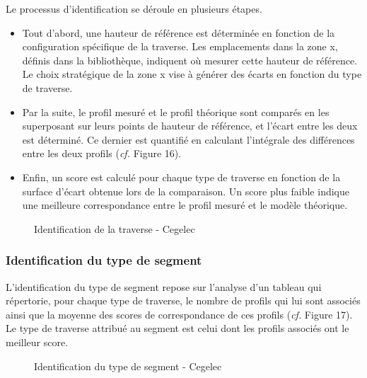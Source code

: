 \noindent Le processus d'identification se déroule en plusieurs étapes.
\begin{itemize}
\item Tout d'abord, une hauteur de référence est déterminée en fonction de la configuration spécifique de la traverse. Les emplacements dans la zone x, définis dans la bibliothèque, indiquent où mesurer cette hauteur de référence. Le choix stratégique de la zone x vise à générer des écarts en fonction du type de traverse.

\item Par la suite, le profil mesuré et le profil théorique sont comparés en les superposant sur leurs points de hauteur de référence, et l'écart entre les deux est déterminé. Ce dernier est quantifié en calculant l'intégrale des différences entre les deux profils (\textit{cf.} Figure 16).

\item Enfin, un score est calculé pour chaque type de traverse en fonction de la surface d'écart obtenue lors de la comparaison. Un score plus faible indique une meilleure correspondance entre le profil mesuré et le modèle théorique.

\end{itemize}
\begin{figure}[H]
            \centering

            \caption{Identification de la traverse - Cegelec \cite{RHEA}} 
        \end{figure}


\subsubsection{Identification du type de segment}
L'identification du type de segment repose sur l'analyse d'un tableau qui répertorie, pour chaque type de traverse, le nombre de profils qui lui sont associés ainsi que la moyenne des scores de correspondance de ces profils (\textit{cf.} Figure 17). Le type de traverse attribué au segment est celui dont les profils associés ont le meilleur score. \\

\begin{figure}[H]
            \centering

            \caption{Identification du type de segment - Cegelec \cite{RHEA}} 
        \end{figure}

